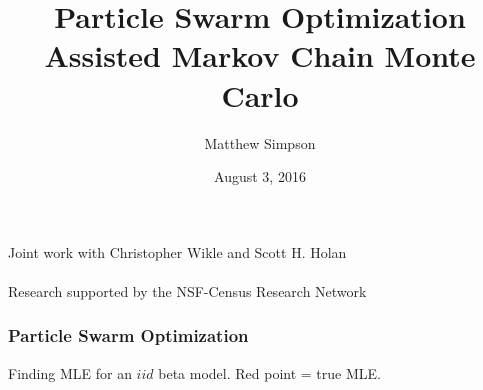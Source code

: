 \documentclass[xcolor=dvipsnames]{beamer}
\title[PSO for MCMC]{Particle Swarm Optimization Assisted Markov Chain Monte Carlo}
\author[Matt Simpson]{Matthew Simpson}
\institute[Mizzou Statistics]{Department of Statistics, University of Missouri}
\date{August 3, 2016}
\begin{document}
\begin{frame}
\titlepage
\centering
{\scriptsize
Joint work with Christopher Wikle and Scott H. Holan\\~\\
Research supported by the NSF-Census Research Network}
\end{frame}

\begin{frame}
\frametitle{Particle Swarm Optimization}
Finding MLE for an $iid$ beta model. Red point = true MLE.
\centering
{}
\end{frame}



\end{document}
